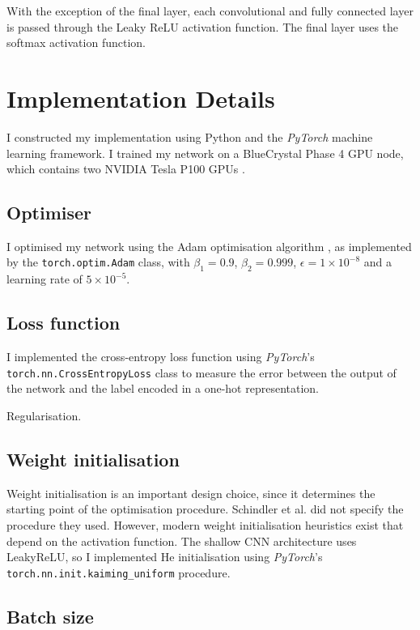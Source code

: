 \documentclass[conference]{IEEEtran}
\begin{document}
With the exception of the final layer, each convolutional and fully connected layer is passed through the Leaky ReLU activation function.
The final layer uses the softmax activation function.

\section{Implementation Details}

I constructed my implementation using Python and the \textit{PyTorch} \cite{PyTorch} machine learning framework.
I trained my network on a BlueCrystal Phase 4 GPU node, which contains two NVIDIA Tesla P100 GPUs \cite{bc4}.

\subsection{Optimiser}

I optimised my network using the Adam optimisation algorithm \cite{KingmaBa}, as implemented by the \texttt{torch.optim.Adam} class, with $\beta_1=0.9$, $\beta_2=0.999$, $\epsilon=1\times10^{-8}$ and a learning rate of $5\times10^{-5}$.

\subsection{Loss function}

I implemented the cross-entropy loss function using \textit{PyTorch}'s \texttt{torch.nn.CrossEntropyLoss} class to measure the error between the output of the network and the label encoded in a one-hot representation.

Regularisation.

\subsection{Weight initialisation}

Weight initialisation is an important design choice, since it determines the starting point of the optimisation procedure.
Schindler et al. did not specify the procedure they used.
However, modern weight initialisation heuristics exist that depend on the activation function.
The shallow CNN architecture uses LeakyReLU, so I implemented He initialisation using \textit{PyTorch}'s \texttt{torch.nn.init.kaiming\_uniform} procedure.

\subsection{Batch size}
\end{document}
